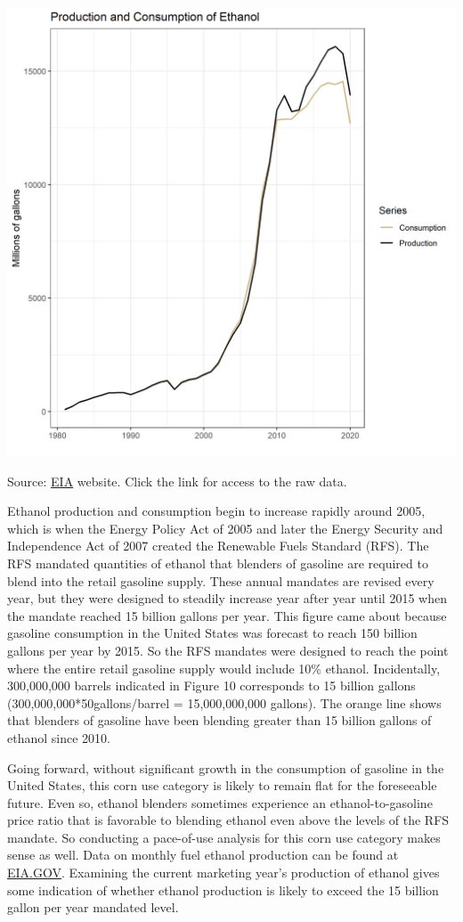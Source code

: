 \documentclass[
  letterpaper,
  DIV=11,
  numbers=noendperiod]{scrreprt}
\begin{document}
\includegraphics{assets/ForecastingUseof-Ethanol.png}

Source:
\href{http://www.eia.gov/totalenergy/data/monthly/\#renewable}{EIA}
website. Click the link for access to the raw data.

Ethanol production and consumption begin to increase rapidly around
2005, which is when the Energy Policy Act of 2005 and later the Energy
Security and Independence Act of 2007 created the Renewable Fuels
Standard (RFS). The RFS mandated quantities of ethanol that blenders of
gasoline are required to blend into the retail gasoline supply. These
annual mandates are revised every year, but they were designed to
steadily increase year after year until 2015 when the mandate reached 15
billion gallons per year. This figure came about because gasoline
consumption in the United States was forecast to reach 150 billion
gallons per year by 2015. So the RFS mandates were designed to reach the
point where the entire retail gasoline supply would include 10\%
ethanol. Incidentally, 300,000,000 barrels indicated in Figure 10
corresponds to 15 billion gallons (300,000,000*50gallons/barrel =
15,000,000,000 gallons). The orange line shows that blenders of gasoline
have been blending greater than 15 billion gallons of ethanol since
2010.

Going forward, without significant growth in the consumption of gasoline
in the United States, this corn use category is likely to remain flat
for the foreseeable future. Even so, ethanol blenders sometimes
experience an ethanol-to-gasoline price ratio that is favorable to
blending ethanol even above the levels of the RFS mandate. So conducting
a pace-of-use analysis for this corn use category makes sense as well.
Data on monthly fuel ethanol production can be found at
\href{http://www.eia.gov/totalenergy/data/monthly/\#renewable}{EIA.GOV}.
Examining the current marketing year's production of ethanol gives some
indication of whether ethanol production is likely to exceed the 15
billion gallon per year mandated level.
\end{document}
